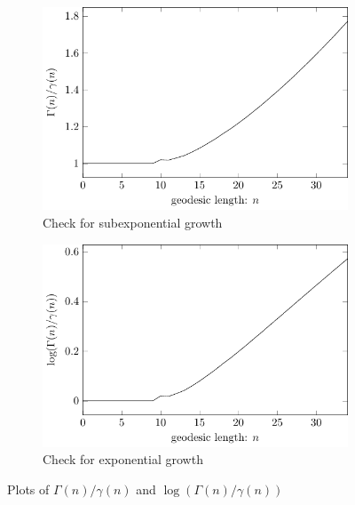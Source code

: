\begin{figure}[!h]
	\centering
	
	\begin{subfigure}{0.48\linewidth}
		\centering
		\includegraphics[width=\linewidth]
			{figures/results/normalGrowth/usual/normalGrowthRatio}
		\caption{Check for subexponential growth}
		\label{fig:normalGrowthRatio:linear}
	\end{subfigure}
	\hfill
	\begin{subfigure}{0.48\linewidth}
		\centering
		\includegraphics[width=\linewidth]
			{figures/results/normalGrowth/log/normalGrowthRatioLog}
		\caption{Check for exponential growth}
		\label{fig:normalGrowthRatio:log}
	\end{subfigure}
	
	\caption{Plots of $\Gamma(n)/\gamma(n)$ and $\log(\Gamma(n)/\gamma(n))$}
	\label{fig:normalGrowthRatio}
\end{figure}

